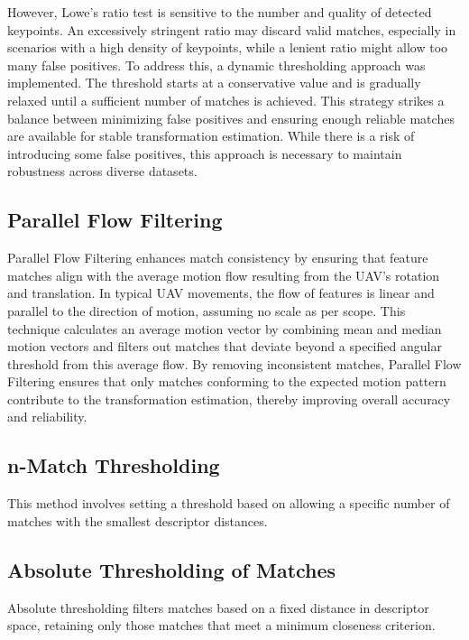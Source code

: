 However, Lowe's ratio test is sensitive to the number and quality of detected keypoints. An excessively stringent ratio may discard valid matches, especially in scenarios with a high density of keypoints, while a lenient ratio might allow too many false positives. To address this, a dynamic thresholding approach was implemented. The threshold starts at a conservative value and is gradually relaxed until a sufficient number of matches is achieved. This strategy strikes a balance between minimizing false positives and ensuring enough reliable matches are available for stable transformation estimation. While there is a risk of introducing some false positives, this approach is necessary to maintain robustness across diverse datasets.

\subsection*{Parallel Flow Filtering}

Parallel Flow Filtering enhances match consistency by ensuring that feature matches align with the average motion flow resulting from the UAV's rotation and translation. In typical UAV movements, the flow of features is linear and parallel to the direction of motion, assuming no scale as per scope. This technique calculates an average motion vector by combining mean and median motion vectors and filters out matches that deviate beyond a specified angular threshold from this average flow. By removing inconsistent matches, Parallel Flow Filtering ensures that only matches conforming to the expected motion pattern contribute to the transformation estimation, thereby improving overall accuracy and reliability.

\subsection*{n-Match Thresholding} 
This method involves setting a threshold based on allowing a specific number of matches with the smallest descriptor distances. 

\subsection*{Absolute Thresholding of Matches} 
Absolute thresholding filters matches based on a fixed distance in descriptor space, retaining only those matches that meet a minimum closeness criterion. 


